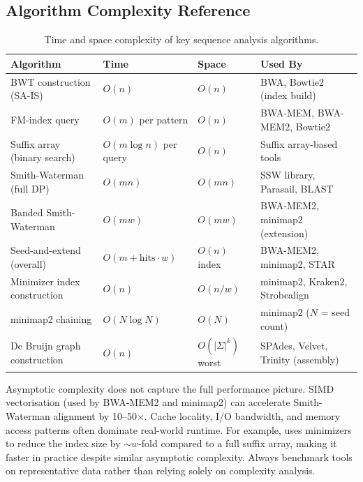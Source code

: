 \subsection{Algorithm Complexity Reference}
\label{subsec:bioinf:complexity}

\begin{table}[htbp]
\centering
\caption{Time and space complexity of key sequence analysis algorithms.}
\label{tab:algorithm-complexity}
\small
\renewcommand{\arraystretch}{1.3}
\begin{tabularx}{\textwidth}{@{}l l l X@{}}
\toprule
\textbf{Algorithm} & \textbf{Time} & \textbf{Space} & \textbf{Used By} \\
\midrule
BWT construction (SA-IS) & $O(n)$ & $O(n)$ & BWA, Bowtie2 (index build) \\
\addlinespace
FM-index query & $O(m)$ per pattern & $O(n)$ & BWA-MEM, BWA-MEM2, Bowtie2 \\
\addlinespace
Suffix array (binary search) & $O(m \log n)$ per query & $O(n)$ & Suffix array-based tools \\
\addlinespace
Smith-Waterman (full DP) & $O(mn)$ & $O(mn)$ & SSW library, Parasail, BLAST \\
\addlinespace
Banded Smith-Waterman & $O(mw)$ & $O(mw)$ & BWA-MEM2, minimap2 (extension) \\
\addlinespace
Seed-and-extend (overall) & $O(m + \text{hits} \cdot w)$ & $O(n)$ index & BWA-MEM2, minimap2, STAR \\
\addlinespace
Minimizer index construction & $O(n)$ & $O(n/w)$ & minimap2, Kraken2, Strobealign \\
\addlinespace
minimap2 chaining & $O(N \log N)$ & $O(N)$ & minimap2 ($N$ = seed count) \\
\addlinespace
De Bruijn graph construction & $O(n)$ & $O(|\Sigma|^k)$ worst & SPAdes, Velvet, Trinity (assembly) \\
\bottomrule
\end{tabularx}
\end{table}

\begin{warningbox}[title={Practical vs Theoretical Complexity}]
Asymptotic complexity does not capture the full performance picture. SIMD vectorisation (used by BWA-MEM2 and minimap2) can accelerate Smith-Waterman alignment by 10--50$\times$. Cache locality, I/O bandwidth, and memory access patterns often dominate real-world runtime. For example,  uses minimizers to reduce the index size by $\sim w$-fold compared to a full suffix array, making it faster in practice despite similar asymptotic complexity. Always benchmark tools on representative data rather than relying solely on complexity analysis.
\end{warningbox}


